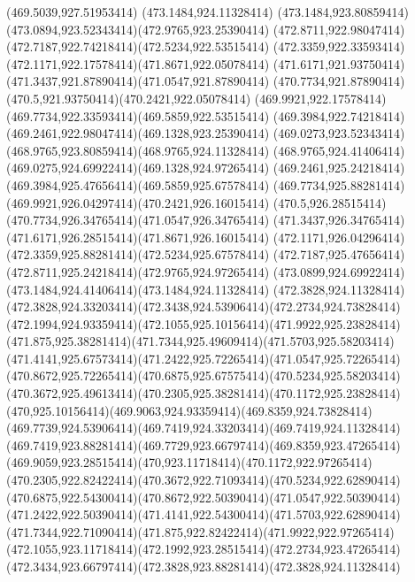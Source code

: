 {{	\lineto(469.5039,927.51953414)
	\closepath
	\moveto(473.1484,924.11328414)
	\curveto(473.1484,923.80859414)(473.0894,923.52343414)(472.9765,923.25390414)
	\curveto(472.8711,922.98047414)(472.7187,922.74218414)(472.5234,922.53515414)
	\curveto(472.3359,922.33593414)(472.1171,922.17578414)(471.8671,922.05078414)
	\curveto(471.6171,921.93750414)(471.3437,921.87890414)(471.0547,921.87890414)
	\curveto(470.7734,921.87890414)(470.5,921.93750414)(470.2421,922.05078414)
	\curveto(469.9921,922.17578414)(469.7734,922.33593414)(469.5859,922.53515414)
	\curveto(469.3984,922.74218414)(469.2461,922.98047414)(469.1328,923.25390414)
	\curveto(469.0273,923.52343414)(468.9765,923.80859414)(468.9765,924.11328414)
	\curveto(468.9765,924.41406414)(469.0275,924.69922414)(469.1328,924.97265414)
	\curveto(469.2461,925.24218414)(469.3984,925.47656414)(469.5859,925.67578414)
	\curveto(469.7734,925.88281414)(469.9921,926.04297414)(470.2421,926.16015414)
	\curveto(470.5,926.28515414)(470.7734,926.34765414)(471.0547,926.34765414)
	\curveto(471.3437,926.34765414)(471.6171,926.28515414)(471.8671,926.16015414)
	\curveto(472.1171,926.04296414)(472.3359,925.88281414)(472.5234,925.67578414)
	\curveto(472.7187,925.47656414)(472.8711,925.24218414)(472.9765,924.97265414)
	\curveto(473.0899,924.69922414)(473.1484,924.41406414)(473.1484,924.11328414)
	\closepath
	\moveto(472.3828,924.11328414)
	\curveto(472.3828,924.33203414)(472.3438,924.53906414)(472.2734,924.73828414)
	\curveto(472.1994,924.93359414)(472.1055,925.10156414)(471.9922,925.23828414)
	\curveto(471.875,925.38281414)(471.7344,925.49609414)(471.5703,925.58203414)
	\curveto(471.4141,925.67573414)(471.2422,925.72265414)(471.0547,925.72265414)
	\curveto(470.8672,925.72265414)(470.6875,925.67575414)(470.5234,925.58203414)
	\curveto(470.3672,925.49613414)(470.2305,925.38281414)(470.1172,925.23828414)
	\curveto(470,925.10156414)(469.9063,924.93359414)(469.8359,924.73828414)
	\curveto(469.7739,924.53906414)(469.7419,924.33203414)(469.7419,924.11328414)
	\curveto(469.7419,923.88281414)(469.7729,923.66797414)(469.8359,923.47265414)
	\curveto(469.9059,923.28515414)(470,923.11718414)(470.1172,922.97265414)
	\curveto(470.2305,922.82422414)(470.3672,922.71093414)(470.5234,922.62890414)
	\curveto(470.6875,922.54300414)(470.8672,922.50390414)(471.0547,922.50390414)
	\curveto(471.2422,922.50390414)(471.4141,922.54300414)(471.5703,922.62890414)
	\curveto(471.7344,922.71090414)(471.875,922.82422414)(471.9922,922.97265414)
	\curveto(472.1055,923.11718414)(472.1992,923.28515414)(472.2734,923.47265414)
	\curveto(472.3434,923.66797414)(472.3828,923.88281414)(472.3828,924.11328414)
}}
